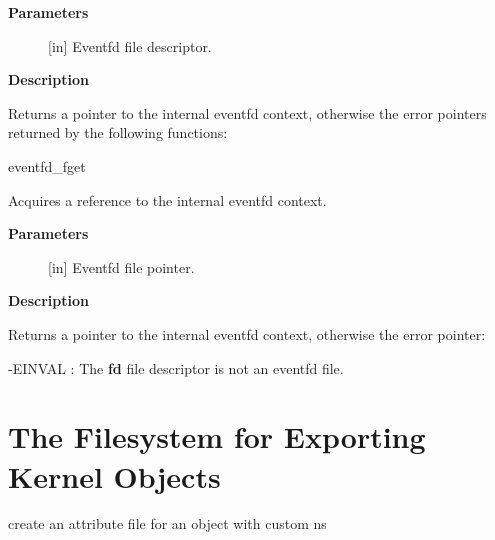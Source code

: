 \documentclass[a4paper,8pt,english]{sphinxmanual}
\begin{document}
\textbf{Parameters}
\begin{description}
\item[{}] \leavevmode
{[}in{]} Eventfd file descriptor.

\end{description}

\textbf{Description}

Returns a pointer to the internal eventfd context, otherwise the error
pointers returned by the following functions:

eventfd\_fget

\begin{fulllineitems}
\label{filesystems/index:c.eventfd_ctx_fileget}
Acquires a reference to the internal eventfd context.

\end{fulllineitems}


\textbf{Parameters}
\begin{description}
\item[{}] \leavevmode
{[}in{]} Eventfd file pointer.

\end{description}

\textbf{Description}

Returns a pointer to the internal eventfd context, otherwise the error
pointer:
\begin{optionlist}{3cm}
\item [-EINVAL]  
: The \textbf{fd} file descriptor is not an eventfd file.
\end{optionlist}


\chapter{The Filesystem for Exporting Kernel Objects}
\label{filesystems/index:the-filesystem-for-exporting-kernel-objects}

\begin{fulllineitems}
\label{filesystems/index:c.sysfs_create_file_ns}
create an attribute file for an object with custom ns

\end{fulllineitems}
\end{document}
